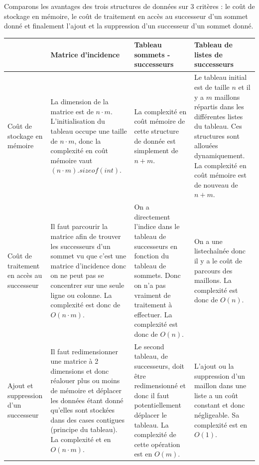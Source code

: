\documentclass[11pt, a4paper]{report}
\begin{document}
    Comparons les avantages des trois structures de données sur 3 critères : le coût de stockage en mémoire, le coût de traitement en accès au successeur d'un sommet donné et finalement l'ajout et la suppression d'un successeur d'un sommet donné.
    
    \begin{center}
        \begin{tabular}{ | p{} | p{} | p{} | p{} | } 
            \hline
            	 &
            	Matrice d'incidence &
            	Tableau sommets - successeurs &
            	Tableau de listes de successeurs \\
            \hline
            	Coût de stockage en mémoire &
            	La dimension de la matrice est de $n·m$. L'initialisation du tableau occupe une taille de $n·m$, donc la complexité en coût mémoire vaut $(n·m).sizeof(int)$. &
            	La complexité en coût mémoire de cette structure de donnée est simplement de $n+m$. &
            	Le tableau initial est de taille $n$ et il y a $m$ maillons répartis dans les différentes listes du tableau. Ces structures sont allouées dynamiquement. La complexité en coût mémoire est de nouveau de $n+m$.\\
            \hline
            	Coût de traitement en accès au successeur &
            	Il faut parcourir la matrice afin de trouver les successeurs d'un sommet vu que c'est une matrice d'incidence donc on ne peut pas se concentrer sur une seule ligne ou colonne. La complexité est donc de $O(n·m)$. &
            	On a directement l'indice dans le tableau de successeurs en fonction du tableau de sommets. Donc on n'a pas vraiment de traitement à effectuer. La complexité est donc de $O(n)$. &
            	On a une listechaînée donc il y a le coût de parcours des maillons. La complexité est donc de $O(n)$.\\
            \hline
            	Ajout et suppression d'un successeur &
            	Il faut redimensionner une matrice à 2 dimensions et donc réalouer plus ou moins de mémoire et déplacer les données étant donné qu'elles sont stockées dans des cases contigues (principe du tableau). La complexité et en $O(n·m)$. &
            	Le second tableau, de successeurs, doit être redimensionné et donc il faut potentiellement déplacer le tableau. La complexité de cette opération est en $O(m)$. &
            	L'ajout ou la suppression d'un maillon dans une liste a un coût constant et donc négligeable. Sa complexité est en $O(1)$.\\
            \hline
        \end{tabular}
    \end{center}
\end{document}
